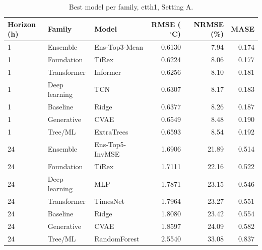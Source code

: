 \begin{table}[ht]
\centering
\small
\caption{Best model per family, etth1, Setting A.}
\label{tab:etth1_A_by_family}
\begin{tabular}{lllrrr}
\toprule
Horizon (h) & Family & Model & RMSE ($^\circ$C) & NRMSE (\%) & MASE \\
\midrule
1 & Ensemble & Ens-Top3-Mean & 0.6130 & 7.94 & 0.174 \\
1 & Foundation & TiRex & 0.6224 & 8.06 & 0.177 \\
1 & Transformer & Informer & 0.6256 & 8.10 & 0.181 \\
1 & Deep learning & TCN & 0.6307 & 8.17 & 0.183 \\
1 & Baseline & Ridge & 0.6377 & 8.26 & 0.187 \\
1 & Generative & CVAE & 0.6549 & 8.48 & 0.190 \\
1 & Tree/ML & ExtraTrees & 0.6593 & 8.54 & 0.192 \\
24 & Ensemble & Ens-Top5-InvMSE & 1.6906 & 21.89 & 0.514 \\
24 & Foundation & TiRex & 1.7111 & 22.16 & 0.522 \\
24 & Deep learning & MLP & 1.7871 & 23.15 & 0.546 \\
24 & Transformer & TimesNet & 1.7964 & 23.27 & 0.551 \\
24 & Baseline & Ridge & 1.8080 & 23.42 & 0.554 \\
24 & Generative & CVAE & 1.8597 & 24.09 & 0.582 \\
24 & Tree/ML & RandomForest & 2.5540 & 33.08 & 0.837 \\
\bottomrule
\end{tabular}
\end{table}